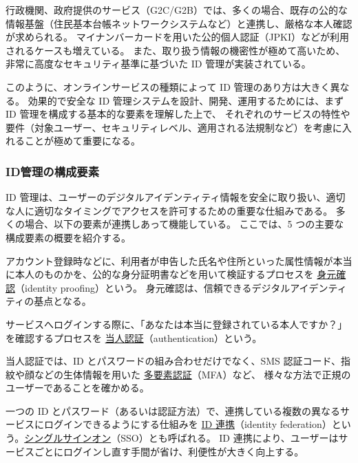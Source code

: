 \documentclass[uplatex]{jsarticle}
\def\label#1{}%
\begin{document}
\begin{exa}[政府提供のサービス（G2C/G2B）の ID 管理]\label{exa:ch1-g2c}
行政機関、政府提供のサービス（G2C/G2B）では、多くの場合、既存の公的な情報基盤（住民基本台帳ネットワークシステムなど）と連携し、厳格な本人確認が求められる。
マイナンバーカードを用いた公的個人認証（JPKI）などが利用されるケースも増えている。
また、取り扱う情報の機密性が極めて高いため、非常に高度なセキュリティ基準に基づいた ID 管理が実装されている。
\end{exa}

このように、オンラインサービスの種類によって ID 管理のあり方は大きく異なる。
効果的で安全な ID 管理システムを設計、開発、運用するためには、まず ID 管理を構成する基本的な要素を理解した上で、
それぞれのサービスの特性や要件（対象ユーザー、セキュリティレベル、適用される法規制など）を考慮に入れることが極めて重要になる。

\subsubsection{ID管理の構成要素}

ID 管理は、ユーザーのデジタルアイデンティティ情報を安全に取り扱い、適切な人に適切なタイミングでアクセスを許可するための重要な仕組みである。
多くの場合、以下の要素が連携しあって機能している。
ここでは、5 つの主要な構成要素の概要を紹介する。

\begin{dfn}[身元確認]\label{dfn:identity-proofing}
アカウント登録時などに、利用者が申告した氏名や住所といった属性情報が本当に本人のものかを、公的な身分証明書などを用いて検証するプロセスを
\underline{身元確認}（identity proofing）という。
身元確認は、信頼できるデジタルアイデンティティの基点となる。
\end{dfn}

\begin{dfn}[当人認証]\label{dfn:authentication}
サービスへログインする際に、「あなたは本当に登録されている本人ですか？」を確認するプロセスを \underline{当人認証}（authentication）という。
\end{dfn}

\begin{exa}[当人認証の方法]\label{exa:ch1-authentication-methods}
当人認証では、ID とパスワードの組み合わせだけでなく、SMS 認証コード、指紋や顔などの生体情報を用いた \underline{多要素認証}（MFA）など、
様々な方法で正規のユーザーであることを確かめる。
\end{exa}

\begin{dfn}[ID連携]\label{dfn:identity-federation}
一つの ID とパスワード（あるいは認証方法）で、連携している複数の異なるサービスにログインできるようにする仕組みを
\underline{ID 連携}（identity federation）という。\underline{シングルサインオン}（SSO）とも呼ばれる。
ID 連携により、ユーザーはサービスごとにログインし直す手間が省け、利便性が大きく向上する。
\end{dfn}
\end{document}
